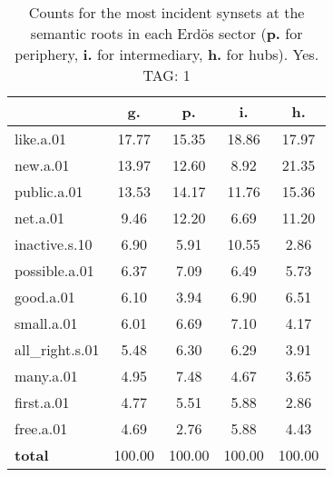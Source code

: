 \begin{table}[h!]
\begin{center}
\begin{tabular}{| l || c | c | c | c |}\hline
 & {\bf g.} & {\bf p.} & {\bf i.} & {\bf h.} \\\hline\hline
like.a.01 & 17.77  & 15.35  & 18.86  & 17.97 \\\hline
new.a.01 & 13.97  & 12.60  & 8.92  & 21.35 \\\hline
public.a.01 & 13.53  & 14.17  & 11.76  & 15.36 \\\hline
net.a.01 & 9.46  & 12.20  & 6.69  & 11.20 \\\hline
inactive.s.10 & 6.90  & 5.91  & 10.55  & 2.86 \\\hline
possible.a.01 & 6.37  & 7.09  & 6.49  & 5.73 \\\hline
good.a.01 & 6.10  & 3.94  & 6.90  & 6.51 \\\hline
small.a.01 & 6.01  & 6.69  & 7.10  & 4.17 \\\hline
all\_right.s.01 & 5.48  & 6.30  & 6.29  & 3.91 \\\hline
many.a.01 & 4.95  & 7.48  & 4.67  & 3.65 \\\hline
first.a.01 & 4.77  & 5.51  & 5.88  & 2.86 \\\hline
free.a.01 & 4.69  & 2.76  & 5.88  & 4.43 \\\hline\hline
{{\bf total}} & 100.00  & 100.00  & 100.00  & 100.00 \\\hline
\end{tabular}
\caption{Counts for the most incident synsets at the semantic roots in each Erd\"os sector ({\bf p.} for periphery, {\bf i.} for intermediary, {\bf h.} for hubs). Yes. TAG: 1}
\end{center}
\end{table}